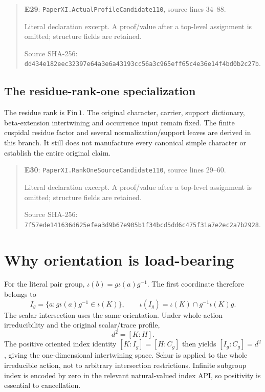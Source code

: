 \documentclass[10pt,oneside]{book}
\begin{document}
\begin{quote}\footnotesize\textbf{E29}: \nolinkurl{PaperXI.ActualProfileCandidate110}, source lines 34--88.\par Literal declaration excerpt. A proof/value after a top-level assignment is omitted; structure fields are retained.\par Source SHA-256: {\scriptsize\texttt{dd434e182eec32397e64a3e6a43193cc56a3c965eff65c4e36e14f4bd0b2c27b}}.\end{quote}


\subsection{The residue-rank-one specialization}
\label{guide:E30}
The residue rank is \(\mathrm{Fin}\,1\). The original character, carrier, support dictionary, beta-extension intertwining and occurrence input remain fixed.
The finite cuspidal residue factor and several normalization/support leaves are derived in this branch. It still does not manufacture every canonical simple character or establish the entire original claim.

\begin{quote}\footnotesize\textbf{E30}: \nolinkurl{PaperXI.RankOneSourceCandidate110}, source lines 29--60.\par Literal declaration excerpt. A proof/value after a top-level assignment is omitted; structure fields are retained.\par Source SHA-256: {\scriptsize\texttt{7f57ede141636d625efea3d9b67e905b1f34bcd5dd6c475f31a7e2ec2a7b2928}}.\end{quote}


\section{Why orientation is load-bearing}
For the literal pair group, \(\iota(b)=g\iota(a)g^{-1}\). The first coordinate therefore belongs to
\[
 I_g=\{a:g\iota(a)g^{-1}\in\iota(K)\},
 \qquad \iota(I_g)=\iota(K)\cap g^{-1}\iota(K)g.
\]
The scalar intersection uses the same orientation. Under whole-action irreducibility and the original scalar/trace profile,
\[
 d^2=[K:H].
\]
The positive oriented index identity \([K:I_g]=[H:C_g]\) then yields \([I_g:C_g]=d^2\), giving the one-dimensional intertwining space. Schur is applied to the whole irreducible action, not to arbitrary intersection restrictions. Infinite subgroup index is encoded by zero in the relevant natural-valued index API, so positivity is essential to cancellation.
\end{document}
